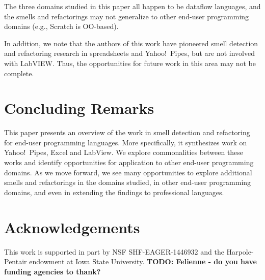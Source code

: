\documentclass[10pt,conference,compsocconf]{IEEEtran}
\newcommand{\todo}[1]{\textbf{TODO: #1}}
\begin{document}
The three domains studied in this paper all happen to be dataflow languages, and the smells and refactorings may not generalize to other end-user programming domains (e.g., Scratch is OO-based). 

In addition, we note that the authors of this work have pioneered smell detection and refactoring research in spreadsheets and Yahoo!\ Pipes, but are not involved with LabVIEW. Thus, the opportunities for future work in this area may not be complete.  

\section{Concluding Remarks}
\label{sec:conclusions}
This paper presents an overview of the work in smell detection and refactoring for end-user programming languages. More specifically, it synthesizes work on Yahoo!\ Pipes, Excel and LabView. We explore commonalities between these works and identify opportunities for application to other end-user programming domains. As we move forward, we see many opportunities to explore additional smells and refactorings in the domains studied, in other end-user programming domains, and even in extending the findings to professional languages. 

\balance

\section*{Acknowledgements}
This work is supported in part by  NSF SHF-EAGER-1446932 and the Harpole-Pentair endowment at Iowa State University. \todo{Felienne - do you have funding agencies to thank?}




\end{document}
